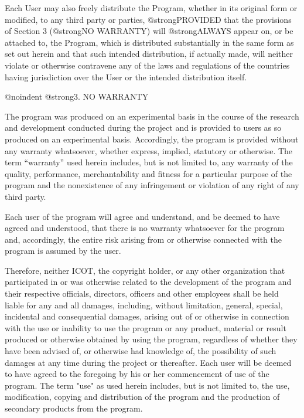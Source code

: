     Each User may also freely distribute the Program, whether in its
original form or modified, to any third party or parties,
@strong{PROVIDED} that the provisions of Section 3 (@strong{NO
WARRANTY}) will @strong{ALWAYS} appear on, or be attached to, the
Program, which is distributed substantially in the same form as set out
herein and that such intended distribution, if actually made, will
neither violate or otherwise contravene any of the laws and regulations
of the countries having jurisdiction over the User or the intended
distribution itself.

@noindent
@strong{3. NO WARRANTY}

    The program was produced on an experimental basis in the course of
the research and development conducted during the project and is
provided to users as so produced on an experimental basis.  Accordingly,
the program is provided without any warranty whatsoever, whether
express, implied, statutory or otherwise.  The term ``warranty'' used
herein includes, but is not limited to, any warranty of the quality,
performance, merchantability and fitness for a particular purpose of the
program and the nonexistence of any infringement or violation of any
right of any third party.

    Each user of the program will agree and understand, and be deemed to
have agreed and understood, that there is no warranty whatsoever for the
program and, accordingly, the entire risk arising from or otherwise
connected with the program is assumed by the user.

    Therefore, neither ICOT, the copyright holder, or any other
organization that participated in or was otherwise related to the
development of the program and their respective officials, directors,
officers and other employees shall be held liable for any and all
damages, including, without limitation, general, special, incidental and
consequential damages, arising out of or otherwise in connection with
the use or inability to use the program or any product, material or
result produced or otherwise obtained by using the program, regardless
of whether they have been advised of, or otherwise had knowledge of, the
possibility of such damages at any time during the project or
thereafter.  Each user will be deemed to have agreed to the foregoing by
his or her commencement of use of the program.  The term "use" as used
herein includes, but is not limited to, the use, modification, copying
and distribution of the program and the production of secondary products
from the program.

